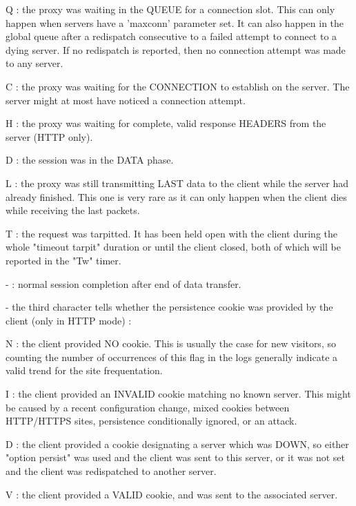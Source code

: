         Q : the proxy was waiting in the QUEUE for a connection slot. This can
            only happen when servers have a 'maxconn' parameter set. It can
            also happen in the global queue after a redispatch consecutive to
            a failed attempt to connect to a dying server. If no redispatch is
            reported, then no connection attempt was made to any server.

        C : the proxy was waiting for the CONNECTION to establish on the
            server. The server might at most have noticed a connection attempt.

        H : the proxy was waiting for complete, valid response HEADERS from the
            server (HTTP only).

        D : the session was in the DATA phase.

        L : the proxy was still transmitting LAST data to the client while the
            server had already finished. This one is very rare as it can only
            happen when the client dies while receiving the last packets.

        T : the request was tarpitted. It has been held open with the client
            during the whole "timeout tarpit" duration or until the client
            closed, both of which will be reported in the "Tw" timer.

        - : normal session completion after end of data transfer.

  - the third character tells whether the persistence cookie was provided by
    the client (only in HTTP mode) :

        N : the client provided NO cookie. This is usually the case for new
            visitors, so counting the number of occurrences of this flag in the
            logs generally indicate a valid trend for the site frequentation.

        I : the client provided an INVALID cookie matching no known server.
            This might be caused by a recent configuration change, mixed
            cookies between HTTP/HTTPS sites, persistence conditionally
            ignored, or an attack.

        D : the client provided a cookie designating a server which was DOWN,
            so either "option persist" was used and the client was sent to
            this server, or it was not set and the client was redispatched to
            another server.

        V : the client provided a VALID cookie, and was sent to the associated
            server.

